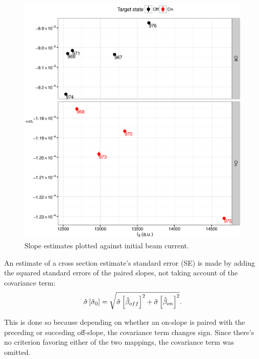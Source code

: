 \documentclass[reprint]{revtex4-1}
\newcommand{\scl}{.4}
\begin{document}
\begin{figure}
\includegraphics[scale=\scl]{img/Slope_VS_IniCurrent.eps}
\caption{Slope estimates plotted against initial beam current.\label{fig:SlpOnI02012}}
\end{figure}


An estimate of a cross section estimate's standard error (SE) is made by adding the squared standard errors of the paired slopes, not taking account of the covariance term:
\begin{equation}
	\SE*{\CS*[0]} = \sqrt{\SE*{\slp*[off]}^2 + \SE*{\slp*[on]}^2}.
\end{equation}

This is done so because depending on whether an on-slope is paired with the preceding or succeding off-slope, the covariance term changes sign. Since there's no criterion favoring either of the two mappings, the covariance term was omitted.

\pagebreak
\end{document}
